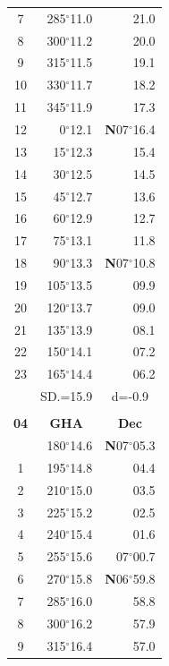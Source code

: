 \documentclass[10pt, a4paper]{report}
\begin{document}
\begin{scriptsize}
\begin{tabular*}{0.2\textwidth}[t]{@{\extracolsep{\fill}}|c|rr|}
7 & 285$^\circ$11.0 & 21.0\\
8 & 300$^\circ$11.2 & 20.0\\
9 & 315$^\circ$11.5 & \raisebox{0.24ex}{\boldmath$\cdot$~\boldmath$\cdot$~~}19.1\\
10 & 330$^\circ$11.7 & 18.2\\
11 & 345$^\circ$11.9 & 17.3\\[2Pt]
12 & 0$^\circ$12.1 & \textbf{N}07$^\circ$16.4\\
13 & 15$^\circ$12.3 & 15.4\\
14 & 30$^\circ$12.5 & 14.5\\
15 & 45$^\circ$12.7 & \raisebox{0.24ex}{\boldmath$\cdot$~\boldmath$\cdot$~~}13.6\\
16 & 60$^\circ$12.9 & 12.7\\
17 & 75$^\circ$13.1 & 11.8\\[2Pt]
18 & 90$^\circ$13.3 & \textbf{N}07$^\circ$10.8\\
19 & 105$^\circ$13.5 & 09.9\\
20 & 120$^\circ$13.7 & 09.0\\
21 & 135$^\circ$13.9 & \raisebox{0.24ex}{\boldmath$\cdot$~\boldmath$\cdot$~~}08.1\\
22 & 150$^\circ$14.1 & 07.2\\
23 & 165$^\circ$14.4 & 06.2\\
\hline
\rule{0pt}{2.4ex} & \multicolumn{1}{c}{SD.=15.9} & \multicolumn{1}{c|}{d=-0.9}\\
\hline
\multicolumn{1}{c}{}\\[-0.5ex]\hline
\multicolumn{1}{|c|}{\rule{0pt}{2.6ex}\textbf{04}} & \multicolumn{1}{c}{\textbf{GHA}} & \multicolumn{1}{c|}{\textbf{Dec}}\\
\hline\rule{0pt}{2.6ex}\noindent
0 & 180$^\circ$14.6 & \textbf{N}07$^\circ$05.3\\
1 & 195$^\circ$14.8 & 04.4\\
2 & 210$^\circ$15.0 & 03.5\\
3 & 225$^\circ$15.2 & \raisebox{0.24ex}{\boldmath$\cdot$~\boldmath$\cdot$~~}02.5\\
4 & 240$^\circ$15.4 & 01.6\\
5 & 255$^\circ$15.6 & 07$^\circ$00.7\\[2Pt]
6 & 270$^\circ$15.8 & \textbf{N}06$^\circ$59.8\\
7 & 285$^\circ$16.0 & 58.8\\
8 & 300$^\circ$16.2 & 57.9\\
9 & 315$^\circ$16.4 & \raisebox{0.24ex}{\boldmath$\cdot$~\boldmath$\cdot$~~}57.0\\

\end{tabular*}
\end{scriptsize}
\end{document}

